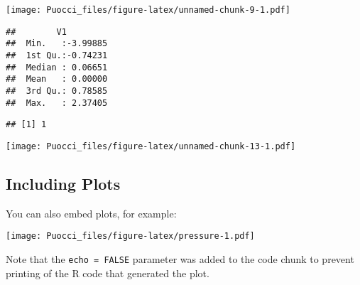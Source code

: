 \documentclass[
]{article}
\newenvironment{Shaded}{\begin{snugshade}}{\end{snugshade}}
\newcommand{\ControlFlowTok}[1]{\textcolor[rgb]{0.13,0.29,0.53}{\textbf{#1}}}
\newcommand{\DecValTok}[1]{\textcolor[rgb]{0.00,0.00,0.81}{#1}}
\newcommand{\KeywordTok}[1]{\textcolor[rgb]{0.13,0.29,0.53}{\textbf{#1}}}
\newcommand{\NormalTok}[1]{#1}
\newcommand{\OperatorTok}[1]{\textcolor[rgb]{0.81,0.36,0.00}{\textbf{#1}}}
\newcommand{\StringTok}[1]{\textcolor[rgb]{0.31,0.60,0.02}{#1}}
\begin{document}
\texttt{[image: Puocci\_files/figure-latex/unnamed-chunk-9-1.pdf]}

\begin{Shaded}
\end{Shaded}

\begin{Shaded}
\end{Shaded}

\begin{verbatim}
##        V1          
##  Min.   :-3.99885  
##  1st Qu.:-0.74231  
##  Median : 0.06651  
##  Mean   : 0.00000  
##  3rd Qu.: 0.78585  
##  Max.   : 2.37405
\end{verbatim}

\begin{Shaded}
\end{Shaded}

\begin{verbatim}
## [1] 1
\end{verbatim}

\texttt{[image: Puocci\_files/figure-latex/unnamed-chunk-13-1.pdf]}

\hypertarget{including-plots}{%
\subsection{Including Plots}\label{including-plots}}

You can also embed plots, for example:

\texttt{[image: Puocci\_files/figure-latex/pressure-1.pdf]}

Note that the \texttt{echo\ =\ FALSE} parameter was added to the code
chunk to prevent printing of the R code that generated the plot.
\end{document}
